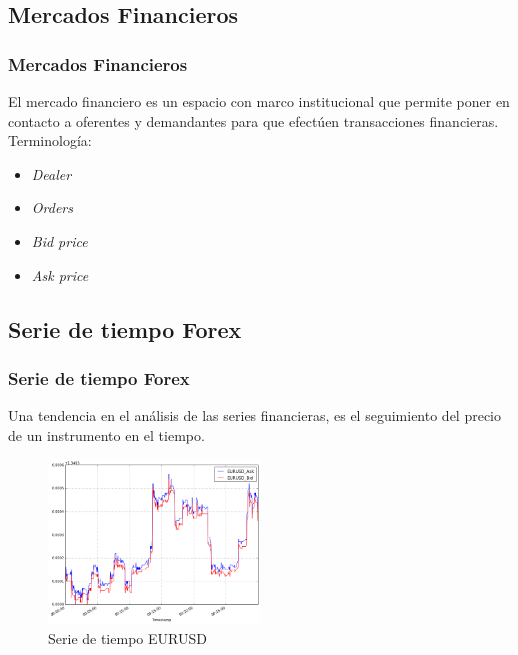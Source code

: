 \documentclass{beamer}
\begin{document}
        \subsection{Mercados Financieros}
            \begin{frame}
            \frametitle{Mercados Financieros}
                El mercado financiero es un espacio con marco institucional que
                permite poner en contacto a oferentes y demandantes para que efectúen
                transacciones financieras. Terminología:
                \begin{itemize}
                    \item \emph{Dealer}
                    \item \emph{Orders}
                    \item \emph{Bid price}
                    \item \emph{Ask price}
                \end{itemize}
            \end{frame}
        \subsection{Serie de tiempo Forex}
            \begin{frame}
            \frametitle{Serie de tiempo Forex}
            Una tendencia en el análisis de las series financieras, es el seguimiento del
            precio de un instrumento en el tiempo.
            \begin{figure}[h!t]
                \begin{center}
                    \includegraphics[width=0.5\textwidth]{img/eurusd}
                    \caption{Serie de tiempo EURUSD}
                    \label{fig:microsoft}
                \end{center}
            \end{figure}

            \end{frame}
\end{document}
